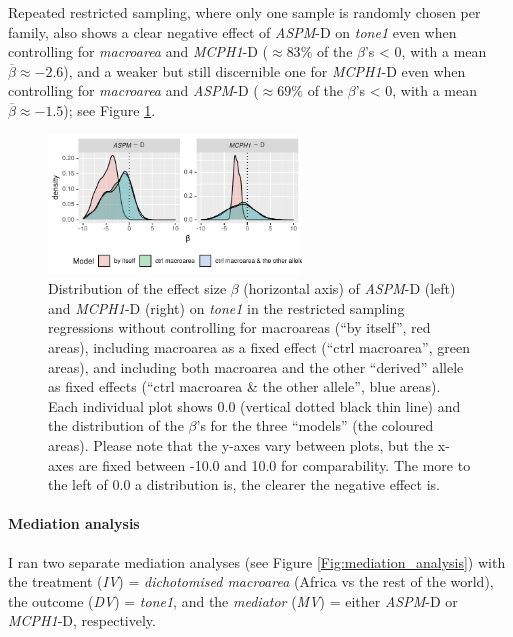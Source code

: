\documentclass[twoside,onecolumn]{article}
\begin{document}
Repeated restricted sampling, where only one sample is randomly chosen per family, also shows a clear negative effect of \textit{ASPM}-D on \textit{tone1} even when controlling for \textit{macroarea} and \textit{MCPH1}-D ($\approx 83\%$ of the $\beta$'s < 0, with a mean $\overline{\beta} \approx -2.6$), and a weaker but still discernible one for \textit{MCPH1}-D even when controlling for \textit{macroarea} and \textit{ASPM}-D ($\approx 69\%$ of the $\beta$'s < 0, with a mean $\overline{\beta} \approx -1.5$); see Figure \ref{Fig:tone1_regressions_restricted}.

\begin{figure}[h]
  \centering
  \includegraphics[width=0.6\textwidth]{../../code/figures/tone1_regressions_restricted}
  \caption{Distribution of the effect size $\beta$ (horizontal axis) of \textit{ASPM}-D (left) and \textit{MCPH1}-D (right) on \textit{tone1} in the restricted sampling regressions without controlling for macroareas (``by itself'', red areas), including macroarea as a fixed effect (``ctrl macroarea'', green areas), and including both macroarea and the other ``derived'' allele as fixed effects (``ctrl macroarea \& the other allele'', blue areas). Each individual plot shows 0.0 (vertical dotted black thin line) and the distribution of the $\beta$'s for the three ``models'' (the coloured areas). Please note that the y-axes vary between plots, but the x-axes are fixed between -10.0 and 10.0 for comparability. The more to the left of 0.0 a distribution is, the clearer the negative effect is.}
  \label{Fig:tone1_regressions_restricted}
\end{figure}


\paragraph{Mediation analysis}

I ran two separate mediation analyses (see Figure \ref{Fig:mediation_analysis}) with the treatment (\textit{IV}) = \textit{dichotomised macroarea} (Africa vs the rest of the world), the outcome (\textit{DV}) = \textit{tone1}, and the \textit{mediator} (\textit{MV}) = either \textit{ASPM}-D or \textit{MCPH1}-D, respectively.
\end{document}
